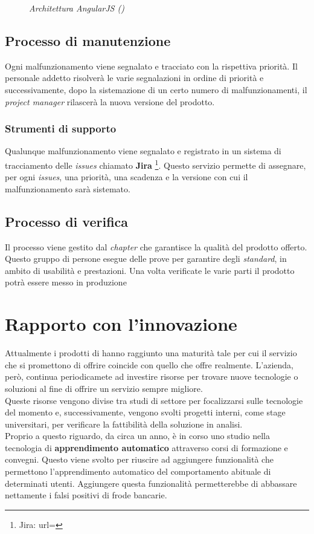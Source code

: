 \begin{itemize}
\begin{figure}[ht]
	\caption{\textit{Architettura AngularJS ()}}
\end{figure}
\end{itemize}

\subsection{Processo di manutenzione}
Ogni malfunzionamento viene segnalato e tracciato con la rispettiva priorità. Il personale addetto risolverà le varie segnalazioni in ordine di priorità e successivamente, dopo la sistemazione di un certo numero di malfunzionamenti, il \textit{project manager} rilascerà la nuova versione del prodotto.
\subsubsection{Strumenti di supporto}
Qualunque malfunzionamento viene segnalato e registrato in un sistema di tracciamento delle \textit{issues} chiamato \textbf{Jira} \footnote{Jira: url= }. Questo servizio permette di assegnare, per ogni \textit{issues}, una priorità, una scadenza e la versione con cui il malfunzionamento sarà sistemato. 
\subsection{Processo di verifica}
Il processo viene gestito dal \textit{chapter} che garantisce la qualità del prodotto offerto. Questo gruppo di persone esegue delle prove per garantire degli \textit{standard}, in ambito di usabilità e prestazioni. Una volta verificate le varie parti il prodotto potrà essere messo in produzione






\section{Rapporto con l'innovazione}
Attualmente i prodotti di \textit{\azienda} hanno raggiunto una maturità tale per cui il servizio che si promettono di offrire coincide con quello che offre realmente. L'azienda, però, continua periodicamete ad investire risorse per trovare nuove tecnologie o soluzioni al fine di offrire un servizio sempre migliore.\\
Queste risorse vengono divise tra studi di settore per focalizzarsi sulle tecnologie del momento e, successivamente, vengono svolti progetti interni, come stage universitari, per verificare la fattibilità della soluzione in analisi. \\
Proprio a questo riguardo, da circa un anno, è in corso uno studio nella tecnologia di \textbf{apprendimento automatico} attraverso corsi di formazione e convegni. Questo viene svolto per riuscire ad aggiungere funzionalità che permettono l'apprendimento automatico del comportamento abituale di determinati utenti. Aggiungere questa funzionalità permetterebbe di abbassare nettamente i falsi positivi di frode bancarie.


